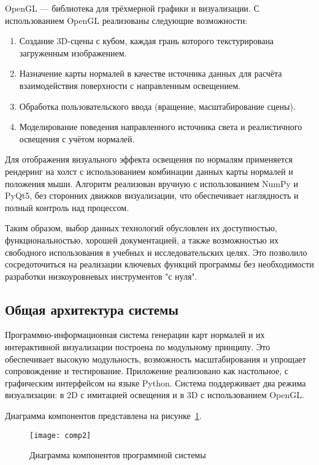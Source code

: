 OpenGL — библиотека для трёхмерной графики и визуализации.
С использованием OpenGL реализованы следующие возможности:
\begin{enumerate}
	\item Создание 3D-сцены с кубом, каждая грань которого текстурирована загруженным изображением.
	\item Назначение карты нормалей в качестве источника данных для расчёта взаимодействия поверхности с направленным освещением.
	\item Обработка пользовательского ввода (вращение, масштабирование сцены).
	\item Моделирование поведения направленного источника света и реалистичного освещения с учётом нормалей.
\end{enumerate}

Для отображения визуального эффекта освещения по нормалям применяется рендеринг на холст с использованием комбинации данных карты нормалей и положения мыши. Алгоритм реализован вручную с использованием NumPy и PyQt5, без сторонних движков визуализации, что обеспечивает наглядность и полный контроль над процессом.

Таким образом, выбор данных технологий обусловлен их доступностью, функциональностью, хорошей документацией, а также возможностью их свободного использования в учебных и исследовательских целях. Это позволило сосредоточиться на реализации ключевых функций программы без необходимости разработки низкоуровневых инструментов "с нуля".
\subsection{Общая архитектура системы}

Программно-информационная система генерации карт нормалей и их интерактивной визуализации построена по модульному принципу. Это обеспечивает высокую модульность, возможность масштабирования и упрощает сопровождение и тестирование. Приложение реализовано как настольное, с графическим интерфейсом на языке Python. Система поддерживает два режима визуализации: в 2D с имитацией освещения и в 3D с использованием OpenGL.

Диаграмма компонентов представлена на рисунке~\ref{comp2:image}.

\begin{figure}[ht]
	\texttt{[image: comp2]}
	\caption{Диаграмма компонентов программной системы}
	\label{comp2:image}
\end{figure}

